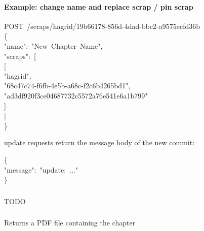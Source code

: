 \documentclass[onecolumn, draftclsnofoot, 10pt, compsoc]{IEEEtran}
\begin{document}
\paragraph{Example: change name and replace scrap / pin scrap}\label{sec-example--change-name-and-replace-scrap-pin-scrap}%
\begin{mdpre}%
\noindent POST~/scraps/hagrid/19b66178-856d-4dad-bbc2-a9575ecfd36b\\
\{\\
"name":~"New~Chapter~Name",\\
"scraps":~{}[\\
[\\
"hagrid",\\
"68c47c74-f6fb-4e5b-a68c-f2c6b4265bd1",\\
"ad3df920f3ce04687732c5572a76e541e6a1b799"\\
]\\
]\\
\}%
\end{mdpre}\noindent{} update requests return the message body of the new commit:
\begin{mdpre}%
\noindent\{\\
"message":~"update:~..."\\
\}%
\end{mdpre}
\subsubsection{}\label{sec-post-chaptersauthoruuidfork}%

\noindent TODO%

\subsubsection{}\label{sec-get-chaptersauthoruuidpdf}%

\noindent Returns a PDF file containing the chapter%

\subsubsection{}\label{sec-get-chaptersauthoruuidhistory}%
\end{document}
